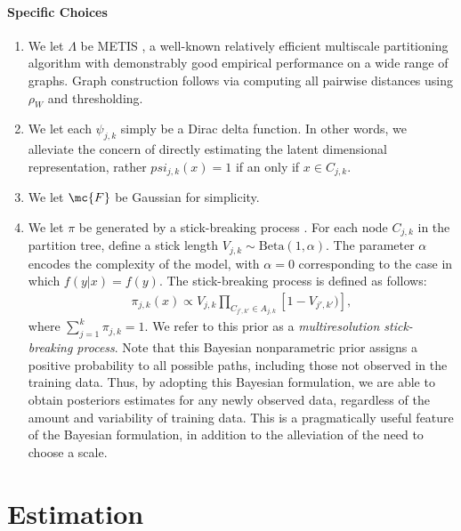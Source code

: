 \paragraph{Specific Choices}

\begin{enumerate}
	\item We let $\Lambda$ be METIS \cite{METIS}, a well-known relatively efficient multiscale partitioning algorithm with demonstrably good empirical performance on a wide range of graphs.  Graph construction follows via computing all pairwise distances using $\rho_W$ and thresholding.
	\item We let each $\psi_{j,k}$ simply be a Dirac delta function.  In other words, we alleviate the concern of directly estimating the latent dimensional representation, rather $psi_{j,k}(x)=1$ if an only if $x \in C_{j,k}$.
	\item We let $\mc{F}$ be Gaussian for simplicity.
	\item We let $\pi$ be generated by a stick-breaking process \cite{stickbreaking}.  For each node $C_{j,k}$ in the partition tree, define a stick length $V_{j,k} \sim \mbox{Beta}(1,\alpha)$.  The parameter $\alpha$ encodes the complexity of the model, with $\alpha=0$ corresponding to the case in which $f(y|x) = f(y)$. The stick-breaking process is defined as follows: 
	\begin{eqnarray*}
	\pi_{j,k}(x) \propto V_{j,k} \prod_{C_{j',k'} \in A_{j,k}} \left[1 - V_{j',k'}) \right],
	\end{eqnarray*}
	where  $\sum_{j=1}^k \pi_{j,k} = 1$.   We refer to this prior as a {\em multiresolution stick-breaking process}. Note that this Bayesian nonparametric prior assigns a positive probability to all possible paths, including those not observed in the training data.  Thus, by adopting this Bayesian formulation, we are able to obtain posteriors estimates for any newly observed data, regardless of the amount and variability of training data.  This is a pragmatically useful feature of the Bayesian formulation, in addition to the alleviation of the need to choose a scale.  
\end{enumerate}




\section{Estimation}



